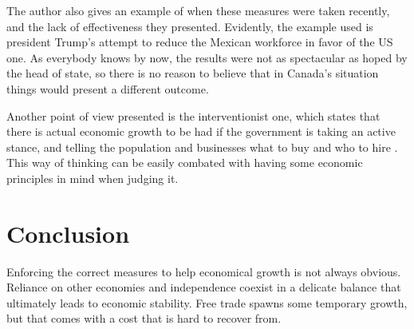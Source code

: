 \documentclass [11pt]{article}
\begin{document}
The author also gives an example of when these measures were taken recently, and the lack of effectiveness they presented. Evidently, the example used is president Trump’s attempt to reduce the Mexican workforce in favor of the US one. As everybody knows by now, the results were not as spectacular as hoped by the head of state, so there is no reason to believe that in Canada’s situation things would present a different outcome. 

Another point of view presented is the interventionist one, which states that there is actual economic growth to be had if the government is taking an active stance, and telling the population and businesses what to buy and who to hire \parencite{MatthewLau2020Adep}. This way of thinking can be easily combated with having some economic principles in mind when judging it. 



\section*{Conclusion}
Enforcing the correct measures to help economical growth is not always obvious. Reliance on other economies and independence coexist in a delicate balance that ultimately leads to economic stability. 
Free trade spawns some temporary growth, but that comes with a cost that is hard to recover from.
\printbibliography
\end{document}
